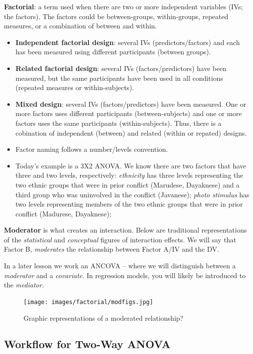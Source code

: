 \documentclass[
  11pt,
]{book}
\providecommand{\tightlist}{%
  \setlength{\itemsep}{0pt}\setlength{\parskip}{0pt}}
\begin{document}
\textbf{Factorial}: a term used when there are two or more independent variables (IVs; the factors). The factors could be between-groups, within-groups, repeated measures, or a combination of between and within.

\begin{itemize}
\tightlist
\item
  \textbf{Independent factorial design}: several IVs (predictors/factors) and each has been measured using different participants (between groups).
\item
  \textbf{Related factorial design}: several IVs (factors/predictors) have been measured, but the same participants have been used in all conditions (repeated measures or within-subjects).
\item
  \textbf{Mixed design}: several IVs (factors/predictors) have been measured. One or more factors uses different participants (between-subjects) and one or more factors uses the same participants (within-subjects). Thus, there is a cobination of independent (between) and related (within or repated) designs.
\item
  Factor naming follows a number/levels convention.
\item
  Today's example is a 3X2 ANOVA. We know there are two factors that have three and two levels, respectively: \emph{ethnicity} has three levels representing the two ethnic groups that were in prior conflict (Marudese, Dayaknese) and a third group who was uninvolved in the conflict (Javanese); \emph{photo stimulus} has two levels representing members of the two ethnic groups that were in prior conflict (Madurese, Dayaknese);
\end{itemize}

\textbf{Moderator} is what creates an interaction. Below are traditional representations of the \emph{statistical} and \emph{conceptual} figures of interaction effects. We will say that Factor B, \emph{moderates} the relationship between Factor A/IV and the DV.

In a later lesson we work an ANCOVA -- where we will distinguish between a \emph{moderator} and a \emph{covariate.} In regression models, you will likely be introduced to the \emph{mediator.}

\begin{figure}
\centering
\texttt{[image: images/factorial/modfigs.jpg]}
\caption{Graphic representations of a moderated relationship?}
\end{figure}

\hypertarget{workflow-for-two-way-anova}{%
\subsection{Workflow for Two-Way ANOVA}\label{workflow-for-two-way-anova}}
\end{document}
